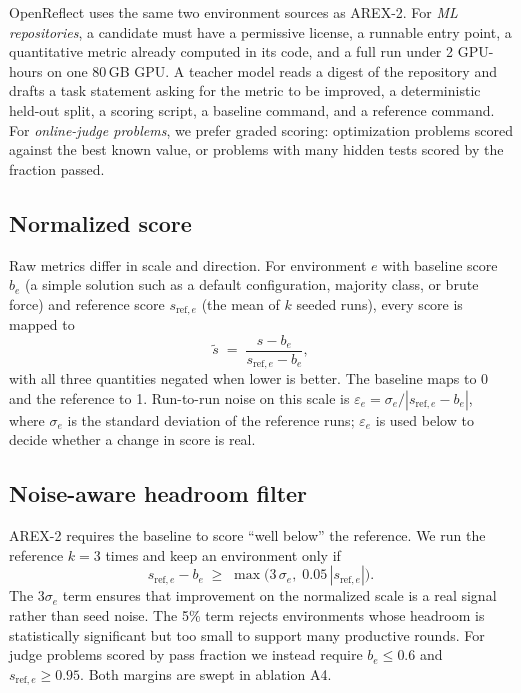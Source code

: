 \documentclass[11pt]{article}
\newcommand{\stilde}{\tilde{s}}
\begin{document}
OpenReflect uses the same two environment sources as AREX-2. For \emph{ML repositories}, a candidate must have a permissive license, a runnable entry point, a quantitative metric already computed in its code, and a full run under 2 GPU-hours on one 80\,GB GPU. A teacher model reads a digest of the repository and drafts a task statement asking for the metric to be improved, a deterministic held-out split, a scoring script, a baseline command, and a reference command. For \emph{online-judge problems}, we prefer graded scoring: optimization problems scored against the best known value, or problems with many hidden tests scored by the fraction passed.

\subsection{Normalized score}
\label{sec:normalize}
Raw metrics differ in scale and direction. For environment $e$ with baseline score $b_e$ (a simple solution such as a default configuration, majority class, or brute force) and reference score $s_{\text{ref},e}$ (the mean of $k$ seeded runs), every score is mapped to
\begin{equation}
  \stilde \;=\; \frac{s - b_e}{s_{\text{ref},e} - b_e},
  \label{eq:norm}
\end{equation}
with all three quantities negated when lower is better. The baseline maps to 0 and the reference to 1. Run-to-run noise on this scale is $\varepsilon_e = \sigma_e / |s_{\text{ref},e} - b_e|$, where $\sigma_e$ is the standard deviation of the reference runs; $\varepsilon_e$ is used below to decide whether a change in score is real.

\subsection{Noise-aware headroom filter}
\label{sec:filter}
AREX-2 requires the baseline to score ``well below'' the reference. We run the reference $k=3$ times and keep an environment only if
\begin{equation}
  s_{\text{ref},e} - b_e \;\ge\; \max\!\big(3\,\sigma_e,\; 0.05\,|s_{\text{ref},e}|\big).
  \label{eq:headroom}
\end{equation}
The $3\sigma_e$ term ensures that improvement on the normalized scale is a real signal rather than seed noise. The 5\% term rejects environments whose headroom is statistically significant but too small to support many productive rounds. For judge problems scored by pass fraction we instead require $b_e \le 0.6$ and $s_{\text{ref},e} \ge 0.95$. Both margins are swept in ablation A4.
\end{document}
